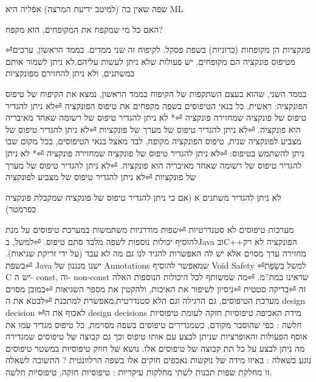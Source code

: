 \begin{טבלא}[!htbp]
      שפה שאין בה (למיטב ידיעת המרצה) אפליה היא ML

      האם כל מי שמקפח את המקופחים, הוא מקפח?

⏎פונקציות הן מקופחות (כרוניות) בשפת פסקל. לקיפוח זה שני ממדים.
      בממד הראשון, ערכים מטיפוס פונקציה הם מקופחים. יש פעולות שלא ניתן לעשות עליהם.לא ניתן לשמור אותם במשתנים, ולא ניתן להחזירם מפונקציות

      בממד השני, שהוא בעצם השתקפות של הקיפוח בממד הראשון, נמצא את הקיפוח של טיפוס הפונקציה:
      ראשית, כל בנאי הטיפוסים בשפה מקפחים את טיפוס הפונקציה
⏎לא ניתן להגדיר טיפוס של פונקציה שמחזירה פונקציה
⏎* לא ניתן להגדיר טיפוס של רשומה שאחד מאיבריה הוא פונקציה.
⏎לא ניתן להגדיר טיפוס של מערך של פונקציות
⏎לא ניתן להגדיר טיפוס של מצביע לפונקציה
      שנית, טיפוס הפונקציה מקופח, לבד מאצל בנאי הטיפוסים, בכל מקום שבו ניתן להשתמש בטיפוס:
⏎לא ניתן להגדיר טיפוס של פונקציה שמחזירה פונקציה
⏎* לא ניתן להגדיר טיפוס של רשומה שאחד מאיבריה הוא פונקציה.
⏎לא ניתן להגדיר טיפוס של מערך של פונקציות
⏎לא ניתן להגדיר טיפוס של מצביע לפונקציה

      לא ניתן להגדיר משתנים א
      (אם כי ניתן להגדיר טיפוס של פונקציה שמקבלת פונקציה כפרמטר)

      מערכות טיפוסים לא סטנדרטיות
⏎שפות מודרניות משתמשות במערכת טיפוסים על מנת להוסיף יכולות נוספות לשפה מלבד סתם טיפוס.
⏎למשל, בJava ובC++הפונקציה לא רק מחזירה ערך מסוים אלא יש לה האפשרות להגיד לנו גם מה לא עבד (על ידי זריקת שגיאות).
⏎בשפת Java ישנו מנגנון של Annotations שמאפשר להוסיף Void Safety
⏎למשל בִּשְׂפַת C יש ה- const, וה- non-const שראינו במת”מ.
⏎מה שמשותף לכל היכולות הנוספות האלה זה
⏎בדיקה סטטית
⏎ניסיון לשיפור את האיכות, ולהקטין את מספר השגיאות
⏎במובן מסוים מערכת הטיפוסים, גם הרגילה וגם הלא סטנדרטית,מאפשרת למתכנת
⏎לבטא את ה design decision
⏎לאכוף את ה design decisions
      מידת האכיפה
      טיפוסיות חזקה לעומת טיפוסיות חלשה : כפי שהוסבר מקודם, כשמגדירים טיפוסים בשפה מסוימת, כל טיפוס מגדיר עמו את אוסף הפעולות והאופרציות שניתן לבצע עם אותו טיפוס וכך גם קבוצה של טיפוסים שמגדירה מה ניתן לבצע על כל תת קבוצה של טיפוסים אלו. נושא של חוזק טיפוסיות במשטר טיפוסים נוגע בשאלה : באיזו מידה של נוקשות נאכפים חוקים אלו בשפה הרלוונטית ?
      התשובה לשאלה זו מחלקת שפות תכנות לשתי מחלקות עיקריות : טיפוסיות חזקה, טיפוסיות חלשה.


\end{טבלא}
